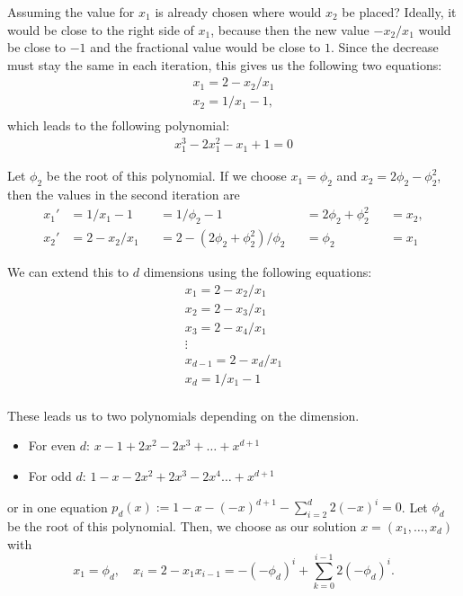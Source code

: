 Assuming the value for $x_1$ is already chosen where would $x_2$ be placed?
Ideally, it would be close to the right side of $x_1$, because then the new
value $-x_2 / x_1$ would be close to $-1$ and the fractional value would be
close to $1$.
Since the decrease must stay the same in each iteration, this gives us the
following two equations:
\begin{align*}
  x_1 = 2 - x_2 / x_1 \\
  x_2 = 1 / x_1 - 1,\\
\end{align*}
which leads to the following polynomial:
\begin{align*}
  x_1^3 - 2x_1^2 - x_1 + 1 = 0
\end{align*}

Let $\phi_2$ be the root of this polynomial.
If we choose $x_1 = \phi_2$ and $x_2 = 2\phi_2 - \phi_2^2$,
then the values in the second iteration are
\[\begin{aligned}
  x_1' & = 1 / x_1 - 1   &  & = 1 / \phi_2 - 1                    &  & = 2\phi_2 + \phi_2^2 &  & = x_2, \\
  x_2' & = 2 - x_2 / x_1 &  & = 2 - (2\phi_2 + \phi_2^2) / \phi_2 &  & = \phi_2             &  & = x_1
\end{aligned}\]

We can extend this to $d$ dimensions using the following equations:
\begin{align*}
  x_1 = 2 - x_2 / x_1 \\
  x_2 = 2 - x_3 / x_1 \\
  x_3 = 2 - x_4 / x_1 \\
  \vdots \\
  x_{d-1} = 2 - x_d / x_1 \\
  x_d = 1 / x_1 - 1 \\
\end{align*}

These leads us to two polynomials depending on the dimension.
\begin{itemize}
  \item For even $d$: $x - 1 + 2 x^2 - 2 x^3 + \dots + x^{d+1}$
  \item For odd $d$: $1 - x - 2 x^2 + 2 x^3 - 2 x^4 \dots + x^{d+1}$
\end{itemize}
or in one equation $p_d(x) := 1 - x - (-x)^{d+1} - \sum_{i = 2}^{d} 2 (-x)^{i} = 0$.
Let $\phi_d$ be the root of this polynomial.
Then, we choose as our solution $x = (x_1, \dots, x_d)$ with
\begin{equation}
  \label{eq:rotate-solution}
  x_1 = \phi_d, \quad x_i = 2 - x_1 x_{i-1} = -(-\phi_d)^i + \sum_{k=0}^{i-1} 2 (-\phi_d)^i.
\end{equation}

